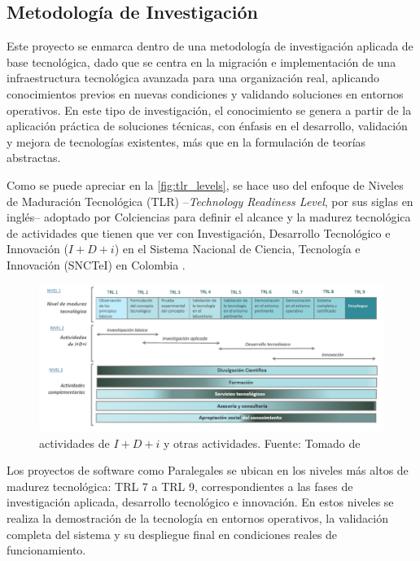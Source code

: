\subsection{Metodología de Investigación}

Este proyecto se enmarca dentro de una metodología de investigación aplicada de base tecnológica, dado que se centra en la migración e implementación de una infraestructura tecnológica avanzada para una organización real, aplicando conocimientos previos en nuevas condiciones y validando soluciones en entornos operativos. En este tipo de investigación, el conocimiento se genera a partir de la aplicación práctica de soluciones técnicas, con énfasis en el desarrollo, validación y mejora de tecnologías existentes, más que en la formulación de teorías abstractas.

Como se puede apreciar en la \autoref{fig:tlr_levels}, se hace uso del enfoque de Niveles de Maduración Tecnológica (TLR) --\textit{Technology Readiness Level}, por sus siglas en inglés-- adoptado por Colciencias para definir el alcance y la madurez tecnológica de actividades que tienen que ver con Investigación, Desarrollo Tecnológico e Innovación ($I+D+i$) en el Sistema Nacional de Ciencia, Tecnología e Innovación (SNCTeI) en Colombia \cite{Colciencias2016}.

\newcommand\tlrLevelsCaption{actividades de $I+D+i$ y otras actividades. \hspace{1em}}

\begin{figure}[H]
  \centering
  \includegraphics[width=1\textwidth]{img/figures/fig8-TLR-explanation.png}
  \caption[\tlrLevelsCaption]{\tlrLevelsCaption Fuente: Tomado de \cite{Colciencias2016}}
  \label{fig:tlr_levels}
\end{figure}

Los proyectos de software como Paralegales se ubican en los niveles más altos de madurez tecnológica: TRL 7 a TRL 9, correspondientes a las fases de investigación aplicada, desarrollo tecnológico e innovación. En estos niveles se realiza la demostración de la tecnología en entornos operativos, la validación completa del sistema y su despliegue final en condiciones reales de funcionamiento.

